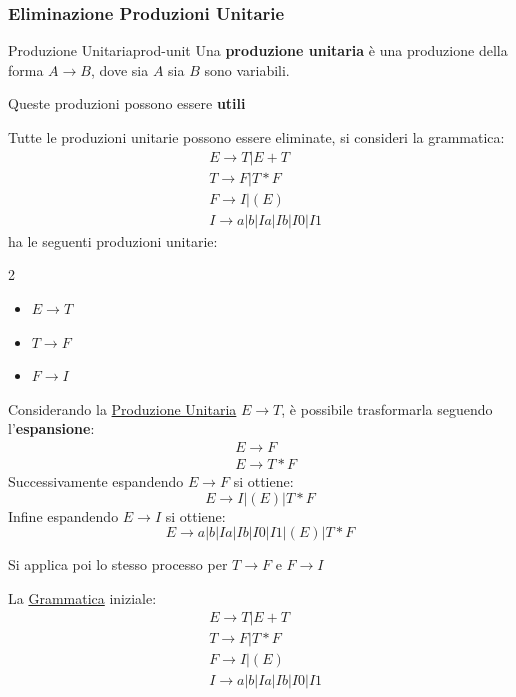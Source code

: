 \subsubsection{Eliminazione Produzioni Unitarie}\label{sub:ll_eliminazione_produzioni_unitarie} %
\begin{definition}{Produzione Unitaria}{prod-unit}
    Una \textbf{produzione unitaria} è una produzione della forma $A\to B$, dove sia $A$ sia $B$ sono variabili.
    \begin{note}
        Queste produzioni possono essere \textbf{utili}
    \end{note}
\end{definition}
Tutte le produzioni unitarie possono essere eliminate, si consideri la grammatica:
\[
    \begin{aligned}
        &E\to T|E+T \\
        &T\to F|T*F \\
        &F\to I|(E) \\
        &I\to a|b|Ia|Ib|I0|I1
    \end{aligned}
\]
ha le seguenti produzioni unitarie:
\begin{multicols}{2}
    \begin{itemize}
        \item $E\to T$
        \item $T\to F$
        \item $F\to I$
    \end{itemize}
\end{multicols}
Considerando la \hyperref[def:prod-unit]{Produzione Unitaria} $E\to T$, è possibile trasformarla seguendo l'\textbf{espansione}:
\[
    \begin{aligned}
        &E\to F \\
        &E\to T*F
    \end{aligned}
\]
Successivamente espandendo $E\to F$ si ottiene:
\[
    E\to I|(E)|T*F
\]
Infine espandendo $E\to I$ si ottiene:
\[
    E\to a|b|Ia|Ib|I0|I1|(E)|T*F
\]
\begin{note}
    Si applica poi lo stesso processo per $T\to F$ e $F\to I$
\end{note}
La \hyperref[def:cfg]{Grammatica} iniziale:
\[
    \begin{aligned}
        &E\to T|E+T \\
        &T\to F|T*F \\
        &F\to I|(E) \\
        &I\to a|b|Ia|Ib|I0|I1
    \end{aligned}
\]
